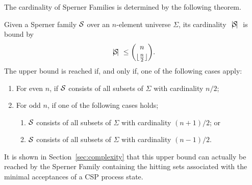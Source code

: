 The cardinality of Sperner Families is determined by the following theorem.
\begin{theorem}
\label{th:sperner} Given a  Sperner family ${\cal S}$ over an $n$-element
universe $\Sigma$, its cardinality ${~|\! {\cal S}\!|~}$ is bound by
\[
{~|\! {\cal S}\!|~} \le \binom{n}{\lfloor\frac{n}{2}\rfloor}.
\]
The upper bound is reached if, and only if, one of the following cases apply:
\begin{enumerate}
\item For even $n$, if ${\cal S}$ consists of all subsets of $\Sigma$ with
    cardinality $n/2$;
\item For odd $n$, if one of the following cases holds;
\begin{enumerate}
\item ${\cal S}$ consists of all subsets of $\Sigma$ with cardinality $(n+1)/2$;
    or
\item ${\cal S}$ consists of all subsets of $\Sigma$ with cardinality $(n-1)/2$.
\end{enumerate}
\end{enumerate}
\xbox
\end{theorem}
It is shown in Section~\ref{sec:complexity} that this upper bound can
actually be reached by the Sperner Family containing the hitting sets
associated with the minimal acceptances of a CSP process state.
